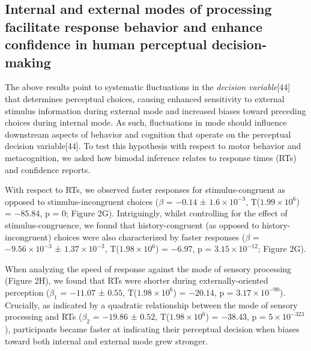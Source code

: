 \documentclass[
]{article}
\begin{document}
\hypertarget{internal-and-external-modes-of-processing-facilitate-response-behavior-and-enhance-confidence-in-human-perceptual-decision-making}{%
\subsection{Internal and external modes of processing facilitate
response behavior and enhance confidence in human perceptual
decision-making}\label{internal-and-external-modes-of-processing-facilitate-response-behavior-and-enhance-confidence-in-human-perceptual-decision-making}}

The above results point to systematic fluctuations in the \emph{decision
variable}{[}44{]} that determines perceptual choices, causing enhanced
sensitivity to external stimulus information during external mode and
increased biases toward preceding choices during internal mode. As such,
fluctuations in mode should influence downstream aspects of behavior and
cognition that operate on the perceptual decision variable{[}44{]}. To
test this hypothesis with respect to motor behavior and metacognition,
we asked how bimodal inference relates to response times (RTs) and
confidence reports.

With respect to RTs, we observed faster responses for stimulus-congruent
as opposed to stimulus-incongruent choices (\(\beta\) = \(-0.14\) ±
\(\ensuremath{1.6\times 10^{-3}}\),
T(\(\ensuremath{1.99\times 10^{6}}\)) = \(-85.84\), p = \(0\); Figure
2G). Intriguingly, whilst controlling for the effect of
stimulus-congruence, we found that history-congruent (as opposed to
history-incongruent) choices were also characterized by faster responses
(\(\beta\) = \(\ensuremath{-9.56\times 10^{-3}}\) ±
\(\ensuremath{1.37\times 10^{-3}}\),
T(\(\ensuremath{1.98\times 10^{6}}\)) = \(-6.97\), p =
\(\ensuremath{3.15\times 10^{-12}}\); Figure 2G).

When analyzing the speed of response against the mode of sensory
processing (Figure 2H), we found that RTs were shorter during
externally-oriented perception (\(\beta_1\) = \(-11.07\) ± \(0.55\),
T(\(\ensuremath{1.98\times 10^{6}}\)) = \(-20.14\), p =
\(\ensuremath{3.17\times 10^{-90}}\)). Crucially, as indicated by a
quadratic relationship between the mode of sensory processing and RTs
(\(\beta_2\) = \(-19.86\) ± \(0.52\),
T(\(\ensuremath{1.98\times 10^{6}}\)) = \(-38.43\), p =
\(\ensuremath{5\times 10^{-323}}\)), participants became faster at
indicating their perceptual decision when biases toward both internal
and external mode grew stronger.
\end{document}
